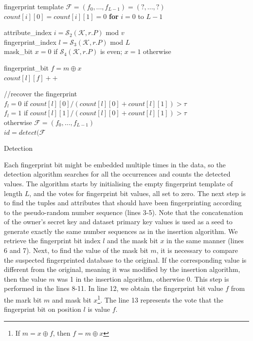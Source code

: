 \documentclass[runningheads]{llncs}
\begin{document}
\begin{algorithm}
  fingerprint template $\mathcal{F}=(f_0,...,f_{L-1})=(?,...,?)$  \\
  $count[i][0]=count[i][1]=0$ \textbf{for} $i=0$ to $L-1$\\ 
  {
    {
        attribute\_index $i=\mathcal{S}_2(\mathcal{K},r.P)$ mod $v$\\
        fingerprint\_index $l=\mathcal{S}_3(\mathcal{K},r.P)$ mod $L$\\
        mask\_bit $x=0$ if $\mathcal{S}_4(\mathcal{K},r.P)$ is even; $x=1$ otherwise\\
        
        fingerprint\_bit $f=m \oplus x$\\
        $count[l][f]++$ 
    }
  }
  //recover the fingerprint\\
  {
    {
    }
    $f_l=0$ if $count[l][0]/(count[l][0]+count[l][1])>\tau$\\
    $f_l=1$ if $count[l][1]/(count[l][0]+count[l][1])>\tau$\\
     otherwise
  }
  $\mathcal{F}=(f_0,...,f_{L-1})$\\
  $id=detect(\mathcal{F}$\\
  {
  }
  \Else
  {
  }
  \caption{Detection}
  \label{alg:detection}
\end{algorithm}

Each fingerprint bit might be embedded multiple times in the data, so the detection algorithm searches for all the occurrences and counts the detected values.
The algorithm starts by initialising the empty fingerprint template of length $L$, and the votes for fingerprint bit values, all set to zero. 
The next step is to find the tuples and attributes that should have been fingerprinting according to the pseudo-random number sequence (lines 3-5). 
Note that the concatenation of the owner's secret key and dataset primary key values is used as a seed to generate exactly the same number sequences as in the insertion algorithm. 
We retrieve the fingerprint bit index $l$ and the mask bit $x$ in the same manner (lines 6 and 7).
Next, to find the value of the mask bit $m$, it is necessary to compare the suspected fingerprinted database to the original. 
If the corresponding value is different from the original, meaning it was modified by the insertion algorithm, then the value $m$ was 1 in the insertion algorithm, otherwise 0. 
This step is performed in the lines 8-11.
In line 12, we obtain the fingerprint bit value $f$ from the mark bit $m$ and mask bit $x$\footnote{If $m=x \oplus f$, then $f=m \oplus x$}.
The line 13 represents the vote that the fingerprint bit on position $l$ is value $f$.
\end{document}
